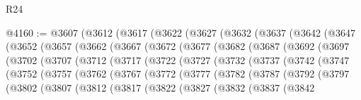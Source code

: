 \begin{lexlean}{R24}
\begin{coremodule}
@4160 := @3607
    (@3612
      (@3617
        (@3622
          (@3627
            (@3632
              (@3637
                (@3642
                  (@3647
                    (@3652
                      (@3657
                        (@3662
                          (@3667
                            (@3672
                              (@3677
                                (@3682
                                  (@3687
                                    (@3692
                                      (@3697
                                        (@3702
                                          (@3707
                                            (@3712
                                              (@3717
                                                (@3722
                                                  (@3727
                                                    (@3732
                                                      (@3737
                                                        (@3742
                                                          (@3747
                                                            (@3752
                                                              (@3757
                                                                (@3762
                                                                  (@3767
                                                                    (@3772
                                                                      (@3777
                                                                        (@3782
                                                                          (@3787
                                                                            (@3792
                                                                              (@3797
                                                                                (@3802
                                                                                  (@3807
                                                                                    (@3812
                                                                                      (@3817
                                                                                        (@3822
                                                                                          (@3827
                                                                                            (@3832
                                                                                              (@3837
                                                                                                (@3842

\end{coremodule}
\end{lexlean}
